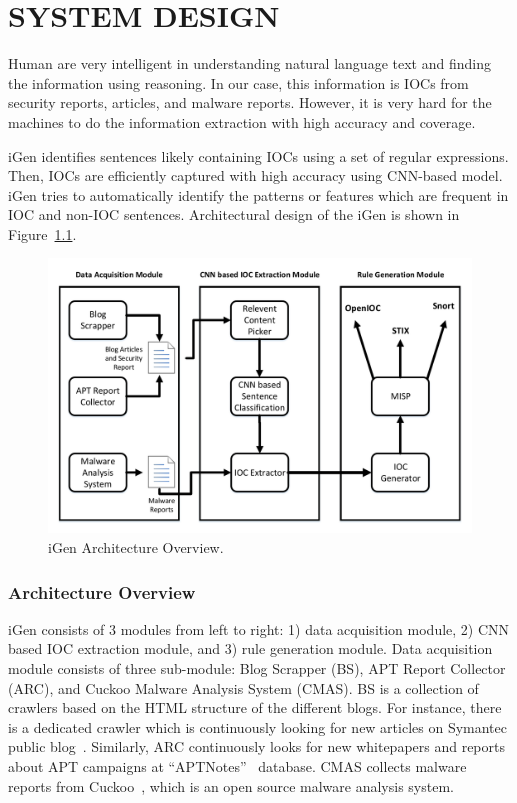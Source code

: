 \chapter{SYSTEM DESIGN}
\label{design}
Human are very intelligent in understanding natural language text and finding the information using reasoning. In our case, this information is IOCs from security reports, articles, and malware reports. However, it is very hard for the machines to do the information extraction with high accuracy and coverage. 

iGen identifies sentences likely containing IOCs using a set of regular expressions. Then, IOCs are efficiently captured with high accuracy using CNN-based model.  iGen tries to automatically identify the patterns or features which are frequent in IOC and non-IOC sentences. Architectural design of the iGen is shown in Figure~\ref{fig:architecture}.


\begin{figure}[tb]
\centering
\includegraphics [width=\linewidth]{Architecture.pdf}
\caption{iGen Architecture Overview.}
\label{fig:architecture}
\end{figure}


\subsection{Architecture Overview}
iGen consists of 3 modules from left to right: 1) data acquisition module, 2) CNN based IOC extraction module, and 3) rule generation module. Data acquisition module consists of three sub-module: Blog Scrapper (BS), APT Report Collector (ARC), and Cuckoo Malware Analysis System (CMAS). BS is a collection of crawlers based on the HTML structure of the different blogs. For instance, there is a dedicated crawler which is continuously looking for new articles on Symantec public blog~\cite{symantecblog}. Similarly, ARC continuously looks for new whitepapers and reports about APT campaigns at ``APTNotes''~\cite{apt} database. CMAS collects malware reports from Cuckoo~\cite{bayer}, which is an open source malware analysis system. 

